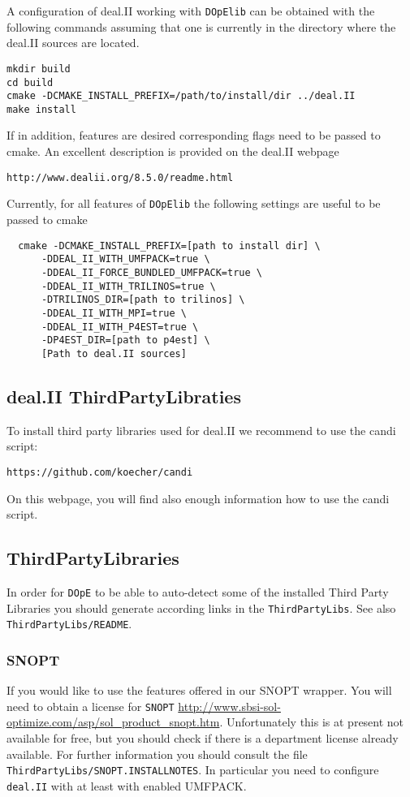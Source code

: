 A configuration of deal.II working with \texttt{DOpElib} can be obtained with
the following commands assuming that one is currently in the 
directory where the deal.II sources are located.
\begin{lstlisting}
mkdir build
cd build 
cmake -DCMAKE_INSTALL_PREFIX=/path/to/install/dir ../deal.II
make install
\end{lstlisting}
If in addition, features are desired corresponding flags need to be passed to
cmake. An excellent description is provided on the deal.II webpage
\begin{lstlisting}
http://www.dealii.org/8.5.0/readme.html
\end{lstlisting}
Currently, for all features of \texttt{DOpElib} the following settings
are useful to be passed to cmake
\begin{lstlisting}
  cmake -DCMAKE_INSTALL_PREFIX=[path to install dir] \ 
      -DDEAL_II_WITH_UMFPACK=true \
      -DDEAL_II_FORCE_BUNDLED_UMFPACK=true \
      -DDEAL_II_WITH_TRILINOS=true \
      -DTRILINOS_DIR=[path to trilinos] \
      -DDEAL_II_WITH_MPI=true \
      -DDEAL_II_WITH_P4EST=true \
      -DP4EST_DIR=[path to p4est] \
      [Path to deal.II sources]
\end{lstlisting}

\subsection{deal.II ThirdPartyLibraties}
To install third party libraries used for deal.II we recommend to use
the candi script:
\begin{lstlisting}
https://github.com/koecher/candi
\end{lstlisting}
On this webpage, you will find also enough information how to use 
the candi script.

\subsection{ThirdPartyLibraries}
In order for \texttt{DOpE} to be able to auto-detect some of the installed 
Third Party Libraries you should generate according links in the 
\texttt{ThirdPartyLibs}. See also \texttt{ThirdPartyLibs/README}.

\subsubsection{SNOPT}
If you would like to use the features offered in our SNOPT wrapper. You will 
need to obtain a license for \texttt{SNOPT} 
\url{http://www.sbsi-sol-optimize.com/asp/sol_product_snopt.htm}.
Unfortunately this is at present not available for free, but you should 
check if 
there is a department license already available.
For further information you should consult the file 
\texttt{ThirdPartyLibs/SNOPT.INSTALLNOTES}. In particular you need to configure 
\texttt{deal.II} with at least with enabled UMFPACK.




